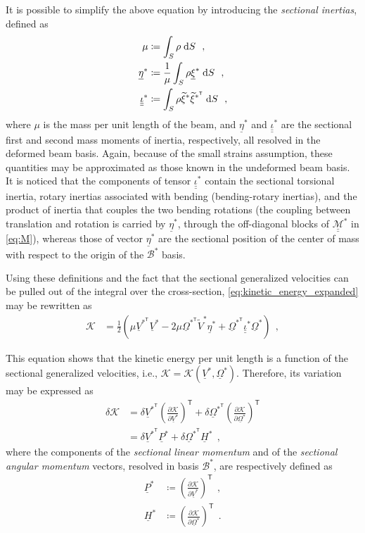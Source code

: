 \documentclass[12pt,a4paper,oneside,english]{abntex2} %
\newcommand{\fix}[1]{{\color{red}#1}}
\newcommand{\vect}[1]{\underline{#1}}
\newcommand{\del}[2]{\frac{\partial#1}{\partial#2}}
\def\tens#1{\underline{\underline{#1}}}
\def\til#1{\widetilde{#1}}
\def\lp{\left(}
\def\rp{\right)}
\def\T{\mathsf{T}}
\def\B*{\mathcal{B}^*}
\def\xis{\vect{\xi}^{*}}
\def\xitils{\til{\xi}^{*}}
\def\xitilsT{\til{\xi}^{*^\T}}
\def\etas{\vect{\eta}^*}
\def\iotas{\tens{\iota}^*}
\def\V{\vect{V}}
\def\Vs{\V^{*}}
\def\VsT{\V^{*^\T}}
\def\Vtils{\til{V}^{*}}
\def\Om{\vect{\Omega}}
\def\Oms{\Om^{*}}
\def\OmsT{\Om^{*^\T}}
\def\P{\vect{P}}
\def\Ps{\P^*}
\def\Hv{\vect{H}}
\def\Hvs{\Hv^*}
\def\d{\textnormal{d}}
\def\Mass{\mathcal{\tens{M}}^*}
\begin{document}
It is possible to simplify the above equation by introducing the \textit{sectional inertias}, defined as
\begin{align}
    \mu &\coloneqq \int_S \rho \;\d S \ \ , \label{eq:sec:mass} 
    \\
    \etas &\coloneqq \frac{1}{\mu}\int_S \rho\xis \;\d S \ \ , \label{eq:sec:mom_inertia_1} 
    \\
    \iotas &\coloneqq \int_S \rho\xitils\xitilsT \;\d S  \ \ , \label{eq:sec:mom_inertia_2}
\end{align}
where $\mu$ is the mass per unit length of the beam, and $\etas$ and $\iotas$ are the sectional first and second mass moments of inertia, respectively, all resolved in the deformed beam basis. Again, because of the small strains assumption, these quantities may be approximated as those known in the undeformed beam basis. It is noticed that the components of tensor $\iotas$ contain the sectional torsional inertia, rotary inertias associated with bending (bending-rotary inertias), and \fix{the product of inertia that couples the two bending rotations (the coupling between translation and rotation is carried by $\etas$, through the off-diagonal blocks of $\Mass$ in \cref{eq:M})}, whereas those of vector $\etas$ are the sectional position of the center of mass with respect to the origin of the $\B*$ basis. 

Using these definitions and the fact that the sectional generalized velocities can be pulled out of the integral over the cross-section, \cref{eq:kinetic_energy_expanded} may be rewritten as
\begin{align}
    \mathcal{K} &= \frac{1}{2} \lp \mu\VsT\Vs - 2\mu\OmsT\Vtils\etas + \OmsT\iotas\Oms \rp \ \ ,
    \label{eq:kinetic_energy_simplified}
\end{align}

This equation shows that the kinetic energy per unit length is a function of the sectional generalized velocities, i.e., $\mathcal{K} = \mathcal{K}\lp\Vs,\Oms\rp$. Therefore, its variation may be expressed as
\begin{align}
    \delta\mathcal{K} &= \delta\VsT\lp\del{\mathcal{K}}{\Vs}\rp^\T + \delta\OmsT\lp\del{\mathcal{K}}{\Oms}\rp^\T \nonumber 
    \\
    &= \delta\VsT\Ps + \delta\OmsT\Hvs \ \ ,
    \label{eq:delK}
\end{align}
where the components of the \textit{sectional linear momentum} and of the \textit{sectional angular momentum} vectors, resolved in basis $\B*$, are respectively defined as
\begin{align}
    \Ps &\coloneqq \lp\del{\mathcal{K}}{\Vs}\rp^\T \ \ , 
    \label{eq:lin_mom} 
    \\
    \Hvs & \coloneqq \lp\del{\mathcal{K}}{\Oms}\rp^\T \ \ .
    \label{eq:ang_mom}
\end{align}
\end{document}
